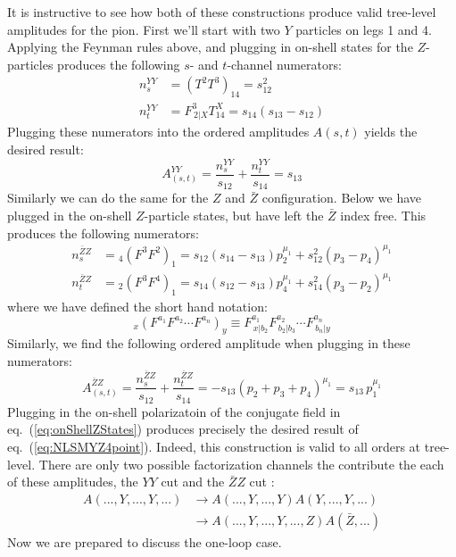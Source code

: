 \documentclass[12pt,letter]{article}
\def\eqn#1{eq.~(\ref{#1})}
\def\be{\begin{equation}}
\def\ee{\end{equation}}
\begin{document}
It is instructive to see how both of these constructions produce valid tree-level amplitudes for the pion. First we'll start with two $Y$ particles on legs 1 and 4. Applying the Feynman rules above, and plugging in on-shell states for the $Z$-particles produces the following $s$- and $t$-channel numerators:
\begin{align}
n^{YY}_s &= (T^2T^3)_{14} = s_{12}^2 
\\
 n^{YY}_t &=  F^{3}_{\,2|X}T^X_{14}  = s_{14}(s_{13}-s_{12})
\end{align}
Plugging these numerators into the ordered amplitudes $A(s,t)$ yields the desired result:
\be\label{eq:NLSMYZ4point}
A^{YY}_{(s,t)} = \frac{n^{YY}_s}{s_{12}}+\frac{ n^{YY}_t }{s_{14}} = s_{13}
\ee
Similarly we can do the same for the $Z$ and $\bar{Z}$ configuration. Below we have plugged in the on-shell $Z$-particle states, but have left the $\bar{Z}$ index free. This produces the following numerators:
\begin{align}
n^{\bar{Z}Z}_s &= {}_4(F^{3}F^{2})_{1} =  s_{12}(s_{14}-s_{13})p_2^{\mu_1}+s_{12}^2(p_3-p_4)^{\mu_1}
\\
 n^{\bar{Z}Z}_t &=   {}_2(F^{3}F^{4})_{1}  = s_{14}(s_{12}-s_{13})p_4^{\mu_1}+s_{14}^2(p_3-p_2)^{\mu_1}
\end{align}
where we have defined the short hand notation:
\be
{}_x(F^{a_1}F^{a_2}\cdots F^{a_n})_{y} \equiv F^{a_1}_{\,x|b_2}F^{a_2}_{\,b_2|b_3}\cdots F^{a_n}_{\,b_n|y}
\ee
Similarly, we find the following ordered amplitude when plugging in these numerators:
\be
A^{\bar{Z}Z}_{(s,t)} = \frac{n^{\bar{Z}Z}_s}{s_{12}}+\frac{ n^{\bar{Z}Z}_t }{s_{14}} = -s_{13}(p_2+p_3+p_4)^{\mu_1} = s_{13} \,p_1^{\mu_1}
\ee
Plugging in the on-shell polarizatoin of the conjugate field in \eqn{eq:onShellZStates} produces precisely the desired result of \eqn{eq:NLSMYZ4point}. Indeed, this construction is valid to all orders at tree-level. There are only two possible factorization channels the contribute the each of these amplitudes, the $YY$ cut and the $\bar{Z}Z$ cut :
\begin{align}
A(...,Y,...,Y,...) &\rightarrow A(...,Y,...,Y)A(Y,...,Y,...)
\\
&\rightarrow A(...,Y,...,Y,...,Z)A(\bar{Z},...)
\end{align}
Now we are prepared to discuss the one-loop case. 
\end{document}
